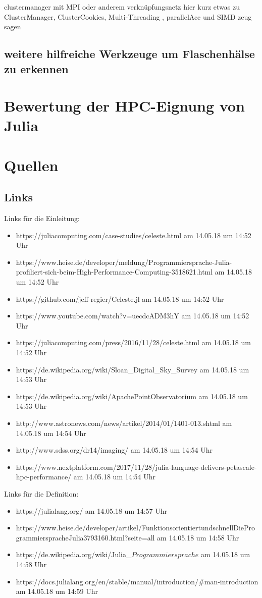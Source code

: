\documentclass[proseminar,german,utf8]{zihpub}
\begin{document}
clustermanager mit MPI oder anderem verknüpfungsnetz
hier kurz etwas zu ClusterManager, ClusterCookies, Multi-Threading , parallelAcc und SIMD zeug sagen

\subsection{weitere hilfreiche Werkzeuge um Flaschenhälse zu erkennen}
\section{Bewertung der HPC-Eignung von Julia}
\section{Quellen}
\subsection{Links}
Links für die Einleitung:
\begin{itemize}
\item https://juliacomputing.com/case-studies/celeste.html am 14.05.18 um 14:52 Uhr
\item https://www.heise.de/developer/meldung/Programmiersprache-Julia-profiliert-sich-beim-High-Performance-Computing-3518621.html am 14.05.18 um 14:52 Uhr
\item https://github.com/jeff-regier/Celeste.jl am 14.05.18 um 14:52 Uhr
\item https://www.youtube.com/watch?v=uecdcADM3hY am 14.05.18 um 14:52 Uhr
\item https://juliacomputing.com/press/2016/11/28/celeste.html am 14.05.18 um 14:52 Uhr
\item https://de.wikipedia.org/wiki/Sloan\_Digital\_Sky\_Survey am 14.05.18 um 14:53 Uhr
\item https://de.wikipedia.org/wiki/Apache\-Point\-Observatorium am 14.05.18 um 14:53 Uhr
\item http://www.astronews.com/news/artikel/2014/01/1401-013.shtml am 14.05.18 um 14:54 Uhr
\item http://www.sdss.org/dr14/imaging/ am 14.05.18 um 14:54 Uhr
\item https://www.nextplatform.com/2017/11/28/julia-language-delivers-petascale-hpc-performance/ am 14.05.18 um 14:54 Uhr
\end{itemize}

Links für die Definition:
\begin{itemize}
\item https://julialang.org/ am 14.05.18 um 14:57 Uhr
\item https://www.heise.de/developer/artikel/Funktionsorientiert\-und\-schnell\-Die\-Programmiersprache\-Julia\-3793160.html?seite=all am 14.05.18 um 14:58 Uhr
\item https://de.wikipedia.org/wiki/Julia\_\(Programmiersprache\) am 14.05.18 um 14:58 Uhr
\item https://docs.julialang.org/en/stable/manual/introduction/\#man-introduction am 14.05.18 um 14:59 Uhr
\end{itemize}
\end{document}
